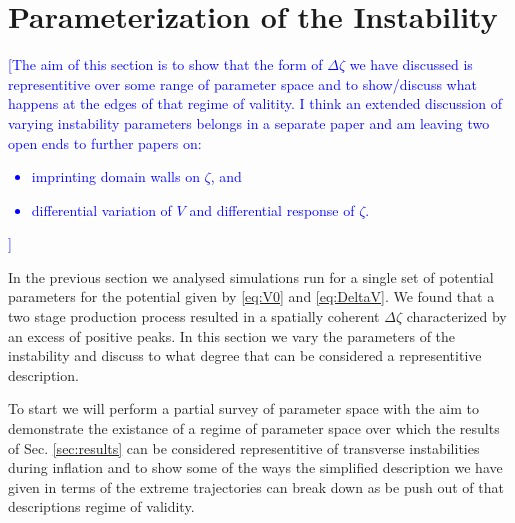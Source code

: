 
\section{Parameterization of the Instability} \label{sec:params}
%
%
%

\textcolor{blue}{[The aim of this section is to show that the form of $\Delta\zeta$ we have discussed is representitive over some range of parameter space and to show/discuss what happens at the edges of that regime of valitity. I think an extended discussion of varying instability parameters belongs in a separate paper and am leaving two open ends to further papers on:
\begin{itemize}
  \item imprinting domain walls on $\zeta$, and
  \item differential variation of $V$ and differential response of $\zeta$.
\end{itemize}
]}

In the previous section we analysed simulations run for a single set of potential parameters for the potential given by \eqref{eq:V0} and \eqref{eq:DeltaV}. We found that a two stage production process resulted in a spatially coherent $\Delta\zeta$ characterized by an excess of positive peaks. In this section we vary the parameters of the instability and discuss to what degree that can be considered a representitive description. %

To start we will perform a partial survey of parameter space with the aim to demonstrate the existance of a regime of parameter space over which the results of Sec. \ref{sec:results} can be considered representitive of transverse instabilities during inflation and to show some of the ways the simplified description we have given in terms of the extreme trajectories can break down as be push out of that descriptions regime of validity.

